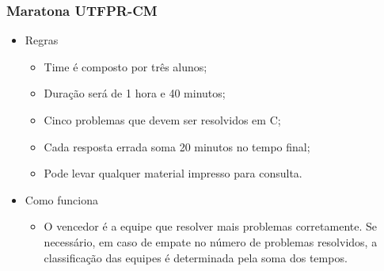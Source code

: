 \begin{frame}
  \frametitle{Maratona UTFPR-CM}
  \begin{itemize}
    \item Regras
    \begin{itemize}
      \item Time é composto por três alunos;
      \item Duração será de 1 hora e 40 minutos;
      \item Cinco problemas que devem ser resolvidos em C;\@
      \item Cada resposta errada soma 20 minutos no tempo final;
      \item Pode levar qualquer material impresso para consulta.
    \end{itemize}
    \item Como funciona
    \begin{itemize}
      \item O vencedor é a equipe que resolver mais problemas corretamente. Se necessário, em caso de empate no número de problemas resolvidos, a classificação das equipes é determinada pela soma dos tempos.
    \end{itemize}
  \end{itemize}
\end{frame}